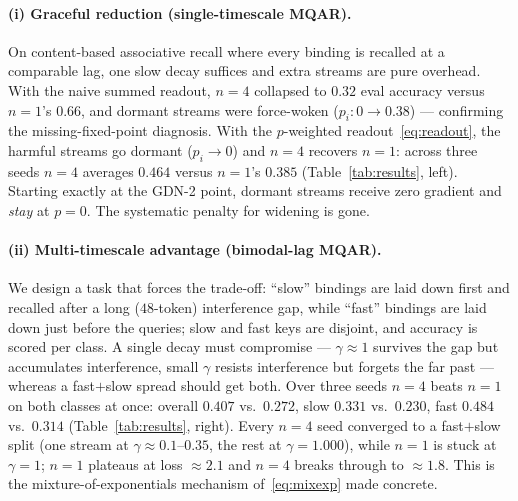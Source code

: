 \documentclass[11pt,letterpaper,logo]{yalearxiv}
\begin{document}
\paragraph{(i) Graceful reduction (single-timescale MQAR).} On content-based
associative recall where every binding is recalled at a comparable lag, one slow
decay suffices and extra streams are pure overhead. With the naive summed readout,
$n{=}4$ collapsed to $0.32$ eval accuracy versus $n{=}1$'s $0.66$, and dormant
streams were force-woken ($p_i\!:0\to0.38$) --- confirming the missing-fixed-point
diagnosis. With the $p$-weighted readout~\eqref{eq:readout}, the harmful streams go
dormant ($p_i \to 0$) and $n{=}4$ recovers $n{=}1$: across three seeds $n{=}4$
averages $0.464$ versus $n{=}1$'s $0.385$ (Table~\ref{tab:results}, left).
Starting exactly at the GDN-2 point, dormant streams receive zero gradient and
\emph{stay} at $p=0$. The systematic penalty for widening is gone.

\paragraph{(ii) Multi-timescale advantage (bimodal-lag MQAR).} We design a task
that forces the trade-off: ``slow'' bindings are laid down first and recalled after
a long ($48$-token) interference gap, while ``fast'' bindings are laid down just
before the queries; slow and fast keys are disjoint, and accuracy is scored per
class. A single decay must compromise --- $\gamma\!\approx\!1$ survives the gap but
accumulates interference, small $\gamma$ resists interference but forgets the far
past --- whereas a fast$+$slow spread should get both. Over three seeds
$n{=}4$ beats $n{=}1$ on both classes at once: overall $0.407$ vs.\ $0.272$, slow
$0.331$ vs.\ $0.230$, fast $0.484$ vs.\ $0.314$ (Table~\ref{tab:results}, right).
Every $n{=}4$ seed converged to a fast$+$slow split (one stream at
$\gamma\!\approx\!0.1\text{--}0.35$, the rest at $\gamma = 1.000$), while $n{=}1$
is stuck at $\gamma = 1$; $n{=}1$ plateaus at loss $\approx 2.1$ and $n{=}4$ breaks
through to $\approx 1.8$. This is the mixture-of-exponentials mechanism
of~\eqref{eq:mixexp} made concrete.
\end{document}
